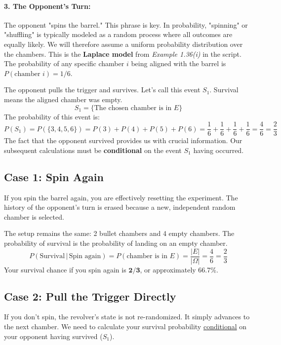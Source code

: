 \documentclass[11pt,a4paper]{article}
\theoremstyle{tutorstyle}
\newcommand{\concept}[2]{\hyperlink{#1}{#2}}
\begin{document}
\paragraph{3. The Opponent's Turn:}
The opponent "spins the barrel." This phrase is key. In probability, "spinning" or "shuffling" is typically modeled as a random process where all outcomes are equally likely. We will therefore assume a uniform probability distribution over the chambers. This is the \textbf{Laplace model} from \textit{Example 1.36(i)} in the script. The probability of any specific chamber $i$ being aligned with the barrel is $P(\text{chamber } i) = 1/6$.

The opponent pulls the trigger and survives. Let's call this event $S_1$. Survival means the aligned chamber was empty.
\[
S_1 = \{\text{The chosen chamber is in } E\}
\]
The probability of this event is:
\[
P(S_1) = P(\{3, 4, 5, 6\}) = P(3) + P(4) + P(5) + P(6) = \frac{1}{6} + \frac{1}{6} + \frac{1}{6} + \frac{1}{6} = \frac{4}{6} = \frac{2}{3}
\]
The fact that the opponent survived provides us with crucial information. Our subsequent calculations must be \textbf{conditional} on the event $S_1$ having occurred.

\subsection{Case 1: Spin Again}
If you spin the barrel again, you are effectively resetting the experiment. The history of the opponent's turn is erased because a new, independent random chamber is selected.

The setup remains the same: 2 bullet chambers and 4 empty chambers. The probability of survival is the probability of landing on an empty chamber.
\[
P(\text{Survival} \,|\, \text{Spin again}) = P(\text{chamber is in } E) = \frac{|E|}{|\Omega|} = \frac{4}{6} = \frac{2}{3}
\]
Your survival chance if you spin again is $\mathbf{2/3}$, or approximately 66.7\%.

\subsection{Case 2: Pull the Trigger Directly}
If you don't spin, the revolver's state is not re-randomized. It simply advances to the next chamber. We need to calculate your survival probability \concept{concept_condprob}{conditional} on your opponent having survived ($S_1$).
\end{document}
